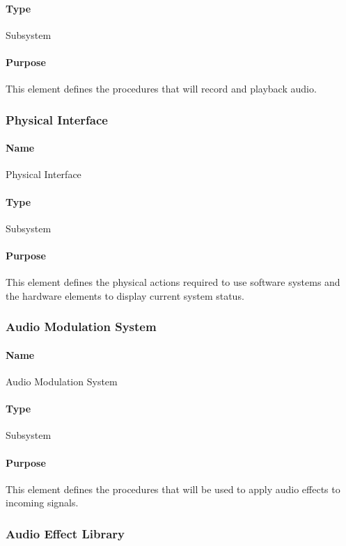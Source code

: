         \paragraph{Type}    Subsystem
        \paragraph{Purpose} This element defines the procedures that will record and playback audio.

    \subsubsection{Physical Interface}
        \paragraph{Name}    Physical Interface
        \paragraph{Type}    Subsystem
        \paragraph{Purpose} This element defines the physical actions required to use software systems and the hardware elements to display current system status.
        
    \subsubsection{Audio Modulation System}
        \paragraph{Name}    Audio Modulation System
        \paragraph{Type}    Subsystem
        \paragraph{Purpose} This element defines the procedures that will be used to apply audio effects to incoming signals.
        
    \subsubsection{Audio Effect Library}
